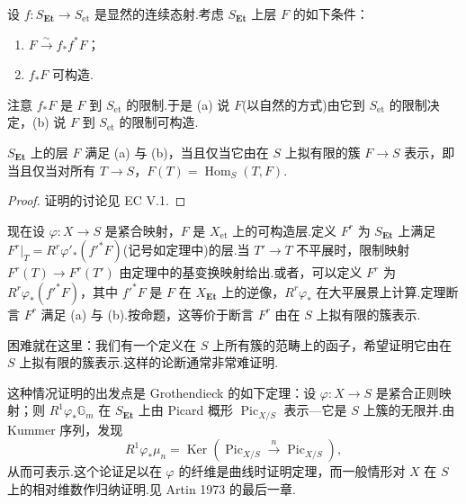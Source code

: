 设 $f \colon S_{\mathbf{Et}} \to S_{\mathrm{et}}$ 是显然的连续态射.考虑 $S_{\mathbf{Et}}$ 上层 $F$ 的如下条件：
\begin{enumerate}
  \item $F \xrightarrow{\sim} f_{*}f^{*}F$；
  \item $f_{*}F$ 可构造.
\end{enumerate}
注意 $f_{*}F$ 是 $F$ 到 $S_{\mathrm{et}}$ 的限制.于是 (a) 说 $F$(以自然的方式)由它到 $S_{\mathrm{et}}$ 的限制决定，(b) 说 $F$ 到 $S_{\mathrm{et}}$ 的限制可构造.

\begin{proposition}\label{prop:17.11}
$S_{\mathbf{Et}}$ 上的层 $F$ 满足 (a) 与 (b)，当且仅当它由在 $S$ 上拟有限的簇 $F \to S$ 表示，即当且仅当对所有 $T \to S$，$F(T) = \operatorname{Hom}_S(T, F)$.
\end{proposition}

\begin{proof}
证明的讨论见 EC V.1.
\end{proof}

现在设 $\varphi \colon X \to S$ 是紧合映射，$F$ 是 $X_{\mathrm{et}}$ 上的可构造层.定义 $F^r$ 为 $S_{\mathbf{Et}}$ 上满足 $F^r|_{T} = R^{r}\varphi'_*(f'^{*}F)$(记号如定理中)的层.当 $T' \to T$ 不平展时，限制映射 $F^r(T) \to F^r(T')$ 由定理中的基变换映射给出.或者，可以定义 $F^r$ 为 $R^{r}\varphi_*(f'^{*}F)$，其中 $f'^{*}F$ 是 $F$ 在 $X_{\mathbf{Et}}$ 上的逆像，$R^{r}\varphi_*$ 在大平展景上计算.定理断言 $F^r$ 满足 (a) 与 (b).按命题，这等价于断言 $F^r$ 由在 $S$ 上拟有限的簇表示.

困难就在这里：我们有一个定义在 $S$ 上所有簇的范畴上的函子，希望证明它由在 $S$ 上拟有限的簇表示.这样的论断通常非常难证明.

这种情况证明的出发点是 Grothendieck 的如下定理：设 $\varphi \colon X \to S$ 是紧合正则映射；则 $R^{1}\varphi_{*}\mathbb{G}_{m}$ 在 $S_{\mathbf{Et}}$ 上由 Picard 概形 $\operatorname{Pic}_{X/S}$ 表示---它是 $S$ 上簇的无限并.由 Kummer 序列，发现
\[
R^{1}\varphi_{*}\mu_n = \operatorname{Ker}\left( \operatorname{Pic}_{X/S} \xrightarrow{n} \operatorname{Pic}_{X/S} \right),
\]
从而可表示.这个论证足以在 $\varphi$ 的纤维是曲线时证明定理，而一般情形对 $X$ 在 $S$ 上的相对维数作归纳证明.见 Artin 1973 的最后一章.
